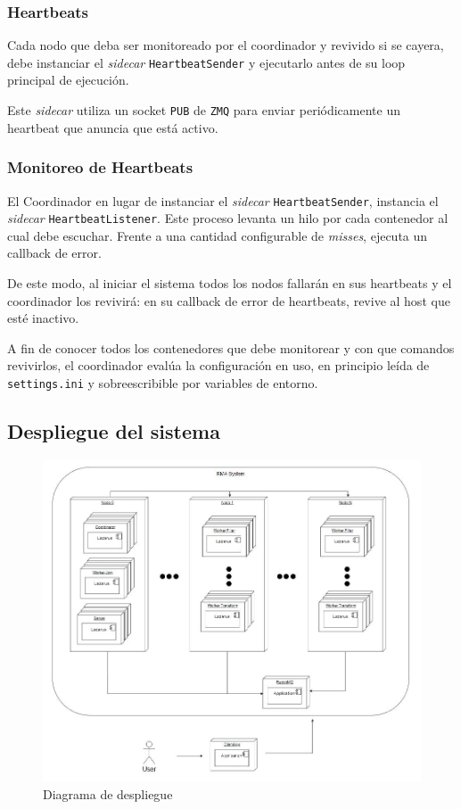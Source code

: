 \documentclass[titlepage,a4paper,oneside]{article}
\begin{document}
\subsubsection{Heartbeats}

Cada nodo que deba ser monitoreado por el coordinador y revivido si se cayera, debe instanciar el \textit{sidecar} \texttt{HeartbeatSender} y ejecutarlo antes de su loop principal de ejecución.

Este \textit{sidecar} utiliza un socket \texttt{PUB} de \texttt{ZMQ} para enviar periódicamente un heartbeat que anuncia que está activo.

\subsubsection{Monitoreo de Heartbeats}

El Coordinador en lugar de instanciar el \textit{sidecar} \texttt{HeartbeatSender}, instancia el \textit{sidecar} \texttt{HeartbeatListener}. Este proceso levanta un hilo por cada contenedor al cual debe escuchar. Frente a una cantidad configurable de \textit{misses}, ejecuta un callback de error.

De este modo, al iniciar el sistema todos los nodos fallarán en sus heartbeats y el coordinador los revivirá: en su callback de error de heartbeats, revive al host que esté inactivo.

A fin de conocer todos los contenedores que debe monitorear y con que comandos revivirlos, el coordinador evalúa la configuración en uso, en principio leída de \texttt{settings.ini} y sobreescribible por variables de entorno.


\subsection{Despliegue del sistema}

\begin{figure}[H]
	\centering
	\includegraphics[width=13cm]{img/despliegue.JPG}
	\caption{Diagrama de despliegue}
\end{figure}
\end{document}

